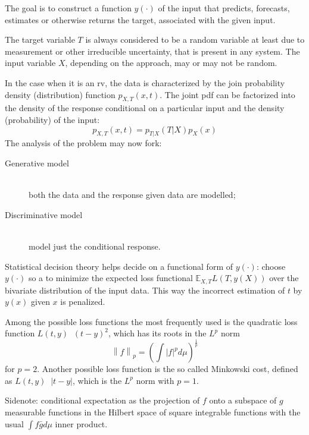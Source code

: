 \documentclass[a4paper]{article}
\newcommand{\brac}[1]{{\left ( #1 \right )}}
\newcommand{\abs}[1]{{\left | #1 \right |}}
\newcommand{\nrm}[1]{{\left\| #1 \right \|}}
\newcommand{\Ex}[0]{{\mathbb{E}}}
\newcommand{\defn}{\mathop{\overset{\Delta}{=}}\nolimits}
\begin{document}
The goal is to construct a function $y(\cdot)$ of the input that predicts, forecasts, estimates or otherwise returns the target, associated with the given input.

The target variable $T$ is always considered to be a random variable at least due to measurement or other irreducible uncertainty, that is present in any system.
The input variable $X$, depending on the approach, may or may not be random.

In the case when it is an rv, the data is characterized by the join probability density (distribution) function $p_{X,T}\brac{x,t}$.
The joint pdf can be factorized into the density of the response conditional on a particular input and the density (probability) of the input:\[p_{X,T}\brac{x,t} = p_{T\rvert X}(T\rvert X) p_X(x) \]
The analysis of the problem may now fork:
\begin{description}
	\item[Generative model] \hfill \\
		both the data and the response given data are modelled;
	\item[Discriminative model] \hfill \\
		model just the conditional response.
\end{description}

Statistical decision theory helps decide on a functional form of $y(\cdot)$:
choose $y(\cdot)$ so a to minimize the expected loss functional $\Ex_{X,T} L\brac{T,y(X)}$
over the bivariate distribution of the input data.
This way the incorrect estimation of $t$ by $y(x)$ given $x$ is penalized.

Among the possible loss functions the most frequently used is the quadratic
loss function $L(t,y) \defn \brac{t-y}^2$, which has its roots in the $L^p$ norm
\[\nrm{f}_p = \brac{\int \abs{f}^p d\mu}^\frac{1}{p}\]
for $p = 2$. Another possible loss function is the so called Minkowski cost,
defined as $L(t,y) \defn \abs{t-y}$, which is the $L^p$ norm with $p=1$.

Sidenote: conditional expectation as the projection of $f$ onto a subspace of $g$ measurable functions in the Hilbert space of square integrable functions with the usual $\int f\bar{g} d\mu$ inner product.

\end{document}
